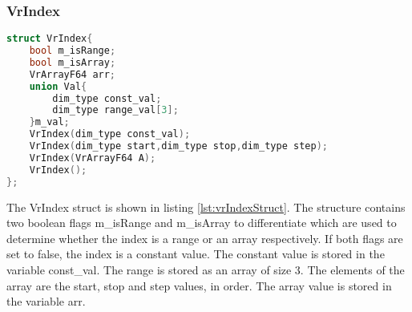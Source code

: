 \subsubsection{VrIndex}
\label{subsubsec:vrindex}
\begin{lstlisting}[float,language=c,caption={VrIndex Structure},label={lst:vrIndexStruct}]
struct VrIndex{ 
	bool m_isRange; 
	bool m_isArray; 
	VrArrayF64 arr;      
	union Val{ 
		dim_type const_val; 
		dim_type range_val[3]; 
	}m_val; 
	VrIndex(dim_type const_val);
	VrIndex(dim_type start,dim_type stop,dim_type step);
	VrIndex(VrArrayF64 A);
	VrIndex();
};
\end{lstlisting}
The VrIndex struct is shown in listing \ref{lst:vrIndexStruct}. The structure contains two boolean flags m\_isRange and m\_isArray to differentiate which are used to determine whether the index is a range or an array respectively. If both flags are set to false, the index is a constant value. The constant value is stored in the variable const\_val. The range is stored as an array of size 3. The elements of the array are the start, stop and step values, in order. The array value is stored in the variable arr.
